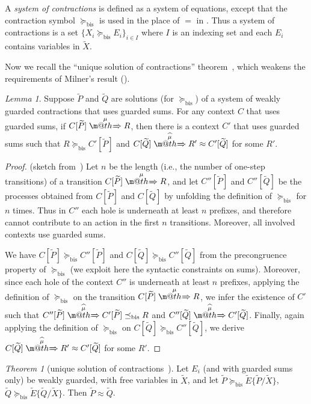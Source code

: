 \documentclass[GCNS]{yincog}
\makeatletter
\def \rightarrowfillWEAK{$\m@th\mathord{\smash=}\mkern-6mu%
  \cleaders\hbox{$\mkern-2mu\mathord{\smash=}\mkern-2mu$}\hfill
  \mkern-6mu\mathord\Rightarrow$}
\theoremstyle{remark}
\theoremstyle{theorem}
\newtheorem{lemma}[definition]{Lemma}
\newtheorem{theorem}[definition]{Theorem}
\theoremstyle{remark}
\newcommand{\Arr}[1]{\mathrel{\stackrel{{\;\;#1\;\;}}{\mbox{\rightarrowfillWEAK}}}}
\newcommand{\Arcap}[1]{\mathrel{\stackrel{{\;\;{\widehat{#1}}\;\;}}{\mbox{\rightarrowfillWEAK}}}}
\newcommand{\ctvtex}[1]{ C \brac{#1} }
\newcommand{\qct}{ C }
\newcommand{\brac}[1]{[#1] }
\renewcommand{\tilde}{\widetilde}
\newcommand{\wbvtex}{\approx}
\newcommand{\mcontrBIS}{\mathrel{\succeq_{\mathrm{bis}}}}
\newcommand{\mexpaBIS}{\mathrel{\preceq_{\mathrm{bis}}}}
\newcommand{\til}{\tilde}
\newcommand{\ctp}[1]{ C' \brac{#1} }
\newcommand{\qctp}{ C' }
\newcommand{\ctpp}[1]{ C'' \brac{#1} }
\newcommand{\qctpp}{ C'' }
\makeatother
\begin{document}
A \emph{system of contractions} is defined as a system of equations, except
that the contraction symbol $\mcontrBIS $ is used in the place of
$=$ in . Thus a system of contractions is a set
$\{ X_i \mcontrBIS E_i\}_{i\in I}$ where $I$ is an indexing set and each
$E_i$ contains variables in $\til X$.

Now we recall the ``unique solution of contractions'' theorem~\cite{sangiorgi2017equations},
which weakens the requirements of Milner's result ().

\begin{lemma}
 \label{l:uptocon}
Suppose $\til P$ and $\til Q$ are solutions (for $\mcontrBIS $) of a system
of weakly guarded contractions that uses guarded sums. For any context
$\qct $ that uses guarded sums, if $\ctvtex{\til P}\Arr{\mu} R$, then there
is a context $\qctp $ that uses guarded sums such that
$R \mcontrBIS \ctp{\til P}$ and
$\ctvtex{\til Q} \Arcap{\mu} R' \wbvtex \ctp{\til Q}$ for some $R'$.
\end{lemma}

\begin{proof}%
{(sketch from~\cite{sangiorgi2017equations})} Let $n$ be the length (i.e.,
the number of one-step transitions) of a transition
$\ctvtex{\til P}\Arr\mu R$, and let $\ctpp {\til P}$ and
$\ctpp {\til Q}$ be the processes obtained from $\ctvtex {\til P}$ and
$\ctvtex {\til Q}$ by unfolding the definition of $\mcontrBIS $ for
$n$ times. Thus in $\qctpp $ each hole is underneath at least $n$ prefixes,
and therefore cannot contribute to an action in the first $n$ transitions.
Moreover, all involved contexts use guarded sums.

We have $\ctvtex{\til P} \mcontrBIS \ctpp{\til P}$ and
$\ctvtex{\til Q} \mcontrBIS \ctpp{\til Q}$ from the precongruence property
of $\mcontrBIS $ (we exploit here the syntactic constraints on sums). Moreover,
since each hole of the context $\qctpp $ is underneath at least $n$ prefixes,
applying the definition of $\mcontrBIS $ on the transition
$\ctvtex{\til P}\Arr{\mu} R$, we infer the existence of $\qctp $ such that
$\ctpp{\til P}\Arcap{\mu} \ctp{\til P} \mexpaBIS R$ and
$\ctpp{\til Q}\Arcap{\mu} \ctp{\til Q}$. Finally, again applying the definition
of $\mcontrBIS $ on $\ctvtex{\til Q} \mcontrBIS \ctpp{\til Q}$, we derive
$\ctvtex{\til Q}\Arcap{\mu} R' \wbvtex \ctp{\til Q}$ for some $R'$.
\end{proof}

\begin{theorem}[unique solution of contractions~\cite{sangiorgi2017equations}]
 \label{t:contraBisimulationU}
Let $E_i$ (and with guarded sums only) be weakly guarded, with free variables
in $\til X$, and let $\til P \mcontrBIS \til E\{\til P/\til X\}$,
$\til Q \mcontrBIS \til E\{\til Q/\til X\}$. Then
$\til P \wbvtex \til Q$.
\end{theorem}
\end{document}
